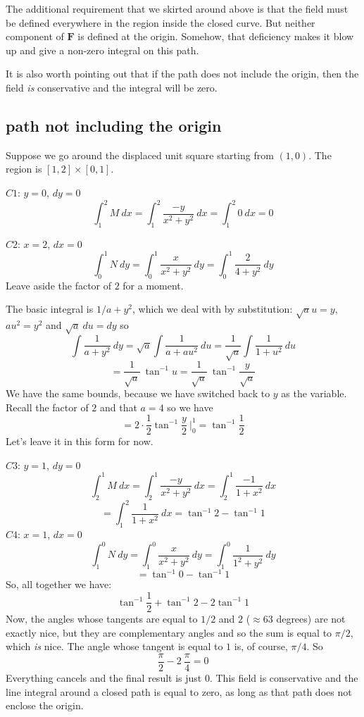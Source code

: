 \documentclass[11pt, oneside]{article}   	%
\begin{document}
The additional requirement that we skirted around above is that the field must be defined everywhere in the region inside the closed curve.  But neither component of $\mathbf{F}$ is defined at the origin.  Somehow, that deficiency makes it blow up and give a non-zero integral on this path.

It is also worth pointing out that if the path does not include the origin, then the field \emph{is} conservative and the integral will be zero.  

\subsection*{path not including the origin}

Suppose we go around the displaced unit square starting from $(1,0)$.  The region is $[1,2] \times [0,1]$.

$C1$:   $y=0$, $dy = 0$
\[ \int_1^2 M \ dx = \int_1^2  \frac{-y}{x^2 + y^2} \ dx =  \int_1^2 0 \ dx = 0 \]

$C2$:   $x=2$, $dx = 0$
\[ \int_0^1 N \ dy = \int_0^1  \frac{x}{x^2 + y^2} \ dy =  \int_0^1 \frac{2}{4 + y^2} \ dy  \]
Leave aside the factor of $2$ for a moment.  

The basic integral is $1/a + y^2$, which we deal with by substitution:  $\sqrt{a} u = y$, $au^2 = y^2$ and $\sqrt{a} \ du = dy$ so
\[ \int \frac{1}{a + y^2} \ dy = \sqrt{a} \int \frac{1}{a + au^2} \ du = \frac{1}{\sqrt{a}} \int \frac{1}{1 + u^2} \ du \] 
\[ = \frac{1}{\sqrt{a}} \ \tan^{-1} u = \frac{1}{\sqrt{a}} \ \tan^{-1} \frac{y}{\sqrt{a} } \]
We have the same bounds, because we have switched back to $y$ as the variable.  Recall the factor of $2$ and that $a = 4$ so we have
\[ = 2 \cdot \frac{1}{2} \tan^{-1} \frac{y}{2} \ \bigg |_0^1 = \tan^{-1} \frac{1}{2} \]
Let's leave it in this form for now.

$C3$:   $y=1$, $dy = 0$
\[ \int_2^1 M \ dx = \int_2^1  \frac{-y}{x^2 + y^2} \ dx = \int_2^1  \frac{-1}{1 + x^2} \ dx \]
\[ = \int_1^2  \frac{1}{1 + x^2} \ dx = \tan^{-1} 2 - \tan^{-1} 1  \]
$C4$:  $x=1$, $dx = 0$
\[ \int_1^0 N \ dy = \int_1^0 \frac{x}{x^2 + y^2} \ dy = \int_1^0 \frac{1}{1^2 + y^2} \ dy \]
\[ = \tan^{-1} 0 - \tan^{-1} 1 \]
So, all together we have:
\[ \tan^{-1} \frac{1}{2} + \tan^{-1} 2 - 2 \tan^{-1} 1 \]
Now, the angles whose tangents are equal to $1/2$ and $2$ ($\approx 63$ degrees) are not exactly nice, but they are complementary angles and so the sum is equal to $\pi/2$, which \emph{is} nice.  The angle whose tangent is equal to $1$ is, of course, $\pi/4$.  So 
\[ \frac{\pi}{2} - 2 \ \frac{\pi}{4} = 0 \]
Everything cancels and the final result is just $0$.  This field is conservative and the line integral around a closed path is equal to zero, as long as that path does not enclose the origin.
\end{document}
